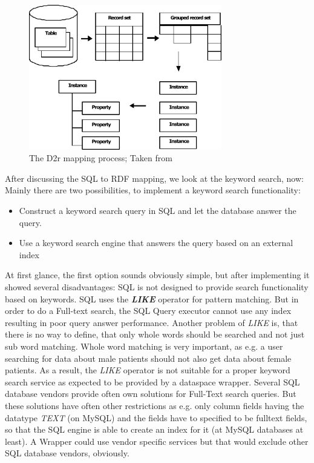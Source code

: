 \begin{figure}[H]
	\begin{center}
		\includegraphics[width=0.75\textwidth]{figures/MappingProcess.pdf}
	\end{center}
	\caption{The D2r mapping process; Taken from \cite{D2rMap_aDatabaseToRdfMappingLanguage}}
	\label{D2rMappingProcessFigure}
\end{figure}

After discussing the SQL to RDF mapping, we look at the keyword search, now:
Mainly there are two possibilities, to implement a keyword search functionality:
\begin{itemize}
	\item {Construct a keyword search query in SQL and let the database answer the query.}
	
	\item {Use a keyword search engine that answers the query based on an external index}
\end{itemize}

At first glance, the first option sounds obviously simple, but after implementing it showed several disadvantages: SQL is not designed to provide search functionality based on keywords. SQL uses the \textbf{\emph{LIKE}} operator for pattern matching. But in order to do a Full-text search, the SQL Query executor cannot use any index resulting in poor query answer performance. Another problem of \emph{LIKE} is, that there is no way to define, that only whole words should be searched and not just sub word matching. Whole word matching is very important, as e.g. a user searching for data about male patients should not also get data about female patients.
As a result, the \emph{LIKE} operator is not suitable for a proper keyword search service as expected to be provided by a dataspace wrapper. Several SQL database vendors provide often own solutions for Full-Text search queries. But these solutions have often other restrictions as e.g. only column fields having the datatype \emph{TEXT} (on MySQL) and the fields have to specified to be fulltext fields, so that the SQL engine is able to create an index for it (at MySQL databases at least).
A Wrapper could use vendor specific services but that would exclude other SQL database vendors, obviously. 

